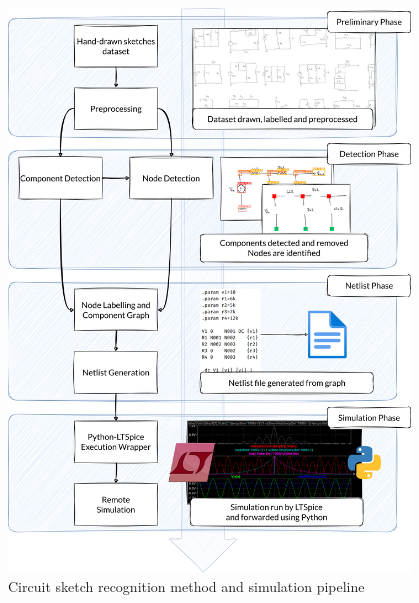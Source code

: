 \documentclass{beamer}
\begin{document}
\begin{frame}[t]
\begin{columns}[t]
\begin{column}{\colwidth}
    \end{column}

    \separatorcolumn

    \begin{column}{\colwidth}



      {\beamerblocknoheader
        \begin{block}{}
          \begin{figure}[t]
            \centering
            \includegraphics[keepaspectratio,width=\colwidth]{../common/graphics/methodology-1}
            \caption{Circuit sketch recognition method and simulation pipeline}
            \label{fig:methodology}
          \end{figure}
        \end{block}
      }


\end{column}
\end{columns}
\end{frame}
\end{document}
